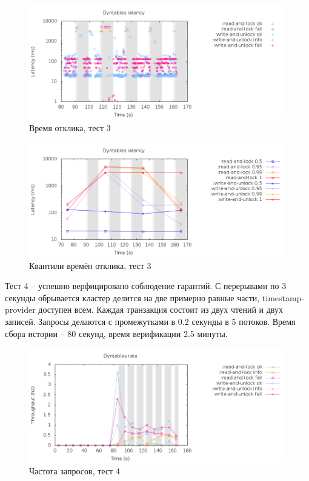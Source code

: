 \documentclass[pdftex,ptm,14pt,a4paper]{extreport}
\theoremstyle{definition}
\begin{document}
\begin{figure}[h]
    \includegraphics[scale=0.6]{dyntables-3/latency-raw.png}
    \caption{Время отклика, тест 3}
\end{figure}

\begin{figure}[h]
    \includegraphics[scale=0.6]{dyntables-3/latency-quantiles.png}
    \caption{Квантили времён отклика, тест 3}
\end{figure}

Тест 4 -- успешно верфицировано соблюдение гарантий. С перерывами по 3 секунды
обрывается кластер делится на две примерно равные части, timestamp-provider доступен всем. Каждая транзакция состоит
из двух чтений и двух записей. Запросы делаются с промежутками в 0.2 секунды в 5 потоков.
Время сбора истории -- 80 секунд, время верификации 2.5 минуты.

\begin{figure}[h]
    \includegraphics[scale=0.6]{dyntables-4/rate.png}
    \caption{Частота запросов, тест 4}
\end{figure}
\end{document}
